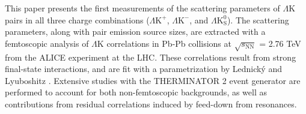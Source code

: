 \documentclass[ALICE,manyauthors]{cernphprep}
\newcommand{\mt}{$m_{\mathrm{T}}$\xspace}
\newcommand{\LamK}{$\Lambda$K\xspace}
\newcommand{\LamKchP}{$\Lambda\mathrm{K^{+}}$\xspace}
\newcommand{\LamKchM}{$\Lambda\mathrm{K^{-}}$\xspace}
\newcommand{\LamKs}{$\Lambda\mathrm{K^{0}_{S}}$\xspace}
\begin{document}
\begin{comment}
Femtoscopic analyses of pions, kaons, and protons have revealed a trend of decreasing source radii with increasing transverse mass \cite{Adam:2015vja}, which, for identical particle pairs, is defined as $m_{\mathrm{T}}^{2} = m^{2} + k_{\mathrm{T}}^{2}$, where $k_{\mathrm{T}} = \frac{1}{2}|\mathbf{p}_{\mathrm{T},1} + \mathbf{p}_{\mathrm{T},2}|$.  
This effect is interpreted as a signature of hydrodynamic flow in the heavy-ion collisions \cite{Akkelin:1995gh}. 
The exponent for \mt-scaling can be shown analytically to be $-\frac{1}{2}$ for case of a one-dimensional longitudinal hydrodynamic expansion with negligible transverse flow and common freeze-out characteristics, regardless of particle species.
This has lead to an idea of universal \mt-scaling for different particle species.
However, it is unclear how the picture changes with significant transverse flow, viscosity corrections, and hadronic rescattering.
Additionally, the scaling observed in models exists separately for the three-dimensional radii in the Longitudinally Co-Moving System (LCMS), and will at best only be approximate in the Pair Rest Frame (PRF) \cite{Adam:2015vja, Kisiel:2014upa}.

The radii extracted from the femtoscopic study are larger than one would except from naively following the trends set forth in the identical particle analyses.  
However, when dealing with non-identical particles, such as in the present case with \LamK pairs, one should not necessarily expect the exact same trend. 
In such cases, the pair emission source, measured through femtoscopy, is the superposition of two single-particle sources, each with its own unique size, shape, and space-time position within the medium.
Although the single-particle sources should abide by the approximate \mt-scaling, the pair sources generally will not.
\end{comment}

This paper presents the first measurements of the scattering parameters of \LamK pairs in all three charge combinations (\LamKchP, \LamKchM, and \LamKs).
The scattering parameters, along with pair emission source sizes, are extracted with a femtoscopic analysis of \LamK correlations in Pb-Pb collisions at $\sqrt{s_{\mathrm{NN}}}$ = 2.76 TeV from the ALICE experiment at the LHC.  
These correlations result from strong final-state interactions, and are fit with a parametrization by Lednick\'y and Lyuboshitz \cite{Lednicky:82}.  
Extensive studies with the THERMINATOR 2 event generator are performed to account for both non-femtoscopic backgrounds, as well as contributions from residual correlations induced by feed-down from resonances.
\end{document}
